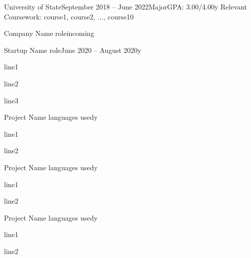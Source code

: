 \documentclass[hidelinks]{simp_styling} %
\begin{document}
\printname
\printbyline



\begin{rEducation}{University of State}{September 2018 – June 2022}{Major}{GPA: 3.00/4.00}{y}
Relevant Coursework: course1, course2, ..., course10
\end{rEducation}


\begin{rSubsection}{Company Name}{\textcolor{gray} \textbar{} role}{incoming}{}
\end{rSubsection}

\begin{rSubsection}{Startup Name}{\textcolor{gray} \textbar{} role}{June 2020 – August 2020}{y}
\item line1
\item line2
\item line3
\end{rSubsection}



\begin{rSubsection}{Project Name}{\textcolor{gray} \textbar{} languages used}{}{y}
\item line1
\item line2
\end{rSubsection}

\begin{rSubsection}{Project Name}{\textcolor{gray} \textbar{} languages used}{}{y}
\item line1
\item line2
\end{rSubsection}

\begin{rSubsection}{Project Name}{\textcolor{gray} \textbar{} languages used}{}{y}
\item line1
\item line2
\end{rSubsection}
\end{document}
